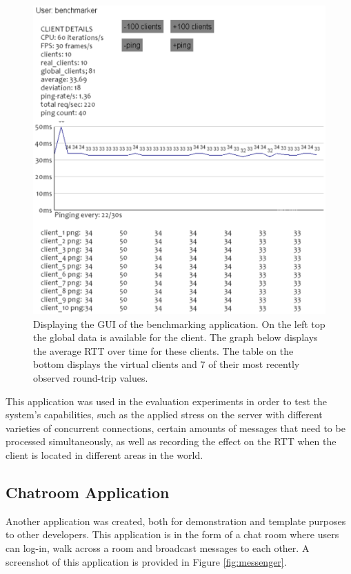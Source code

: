 \documentclass[bsc, 12pt, twoside, singlespacing, parskip, abbrevs, notimes, normalheadings, logo]{styles/infthesis}
\begin{document}
\begin{figure}[H]
\centering
\includegraphics[scale=0.80]{images/benchmarker.eps}
\caption{Displaying the GUI of the benchmarking application. On the left top the global data is available for the client. The graph below displays the average RTT over time for these clients. The table on the bottom displays the virtual clients and 7 of their most recently observed round-trip values.}
\label{fig:benchmark_gui}
\end{figure}

This application was used in the evaluation experiments in order to test the system's capabilities, such as the applied stress on the server with different varieties of concurrent connections, certain amounts of messages that need to be processed simultaneously, as well as recording the effect on the RTT when the client is located in different areas in the world.

\subsection{Chatroom Application}
Another application was created, both for demonstration and template purposes to other developers. This application is in the form of a chat room where users can log-in, walk across a room and broadcast messages to each other. A screenshot of this application is provided in Figure \ref{fig:messenger}.
\end{document}
